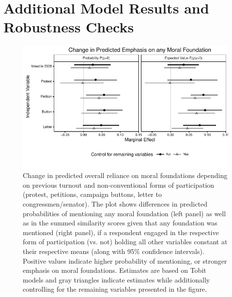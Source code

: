 \documentclass[12pt]{article}
\begin{document}
\clearpage
\section{Additional Model Results and Robustness Checks}\label{app:robust}
\renewcommand\thefigure{\thesection.\arabic{figure}}
\renewcommand\thetable{\thesection.\arabic{table}}
\setcounter{figure}{0}
\setcounter{table}{0}


\begin{figure}[h]\centering
\includegraphics{../calc/fig/tobit_learn_participation.pdf}
\caption{Change in predicted overall reliance on moral foundations depending on previous turnout and non-conventional forms of participation (protest, petitions, campaign buttons, letter to congressmen/senator). The plot shows differences in predicted probabilities of mentioning any moral foundation (left panel) as well as in the summed similarity scores given that any foundation was mentioned (right panel), if a respondent engaged in the respective form of participation (vs. not) holding all other variables constant at their respective means (along with 95\% confidence intervals). Positive values indicate higher probability of mentioning, or stronger emphasis on moral foundations. Estimates are based on Tobit models and gray triangles indicate estimates while additionally controlling for the remaining variables presented in the figure. %
}\label{fig:tobit_learn_participation}
\end{figure}
\end{document}
